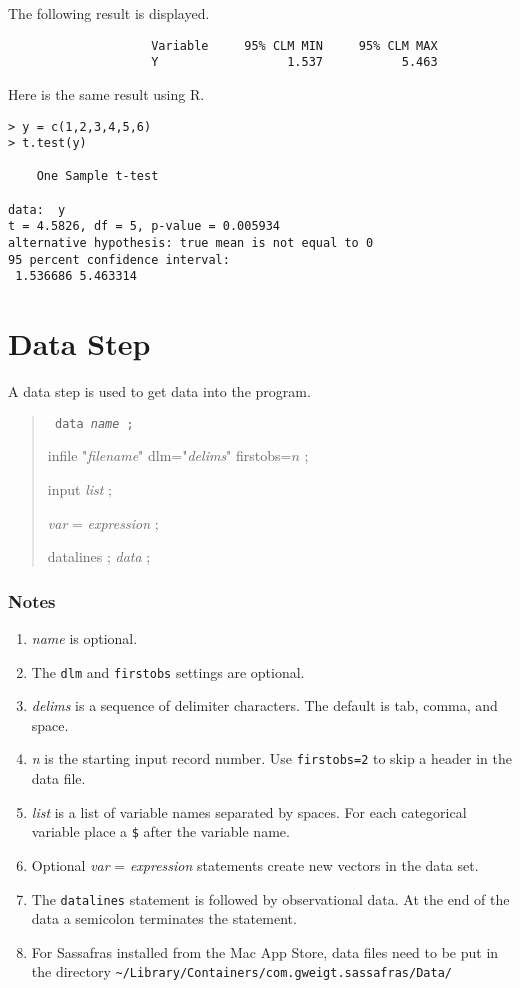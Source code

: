 \documentclass[12pt]{article}
\begin{document}
The following result is displayed.

{\footnotesize\begin{verbatim}
                    Variable     95% CLM MIN     95% CLM MAX
                    Y                  1.537           5.463
\end{verbatim}}

Here is the same result using R.

{\footnotesize\begin{verbatim}
> y = c(1,2,3,4,5,6)
> t.test(y)

	One Sample t-test

data:  y
t = 4.5826, df = 5, p-value = 0.005934
alternative hypothesis: true mean is not equal to 0
95 percent confidence interval:
 1.536686 5.463314
\end{verbatim}}

\newpage

\section{Data Step}
A data step is used to get data into the program.

\begin{quote}
{\tt
data {\it name} ;

infile "{\it filename}" dlm="{\it delims}" firstobs=$n$ ;

input {\it list} ;

{\it var} = {\it expression} ;

datalines ; {\it data} ;
}
\end{quote}

\subsubsection*{Notes}

\begin{enumerate}
\item
{\it name} is optional.
\item
The {\tt dlm} and {\tt firstobs} settings are optional.
\item
{\it delims} is a sequence of delimiter characters.
The default is tab, comma, and space.
\item
{\it n} is the starting input record number.
Use {\tt firstobs=2} to skip a header in the data file.
\item
{\it list} is a list of variable names separated by spaces.
For each categorical variable place a {\tt\$} after the variable name.
\item
Optional {\it var} = {\it expression} statements
create new vectors in the data set.
\item
The {\tt datalines} statement is followed by observational data.
At the end of the data a semicolon terminates the statement.
\item
For Sassafras installed from the Mac App Store,
data files need to be put in the directory
{\footnotesize\verb$~/Library/Containers/com.gweigt.sassafras/Data/$}
\end{enumerate}
\end{document}
